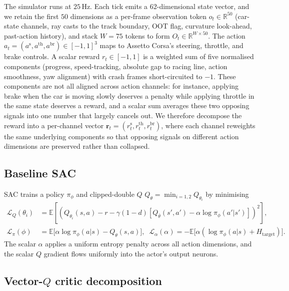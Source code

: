\documentclass{article}
\begin{document}
The simulator runs at $25$\,Hz. Each tick emits a $62$-dimensional
state vector, and we retain the first $50$ dimensions as a per-frame
observation token $o_t \in \mathbb{R}^{50}$ (car-state channels, ray
casts to the track boundary, OOT flag, curvature look-ahead,
past-action history), and stack $W{=}75$ tokens to form
$O_t \in \mathbb{R}^{W\times 50}$. The action
$a_t = (a^\mathrm{s}, a^\mathrm{th}, a^\mathrm{br}) \in [-1, 1]^3$ maps
to Assetto Corsa's steering, throttle, and brake controls. A scalar
reward $r_t \in [-1, 1]$ is a weighted sum of five normalised
components (progress, speed-tracking, absolute gap to racing line,
action smoothness, yaw alignment) with crash frames short-circuited
to $-1$. These components are not all aligned across action
channels: for instance, applying brake when the car is moving
slowly deserves a penalty while applying throttle in the same
state deserves a reward, and a scalar sum averages these two
opposing signals into one number that largely cancels out. We
therefore decompose the reward into a per-channel vector
$\mathbf{r}_t = (r^\mathrm{s}_t, r^\mathrm{th}_t, r^\mathrm{br}_t)$,
where each channel reweights the same underlying components so
that opposing signals on different action dimensions are preserved
rather than collapsed.

\subsection{Baseline SAC}

SAC trains a policy $\pi_\phi$ and clipped-double $Q$
$Q_\theta = \min_{i=1,2} Q_{\theta_i}$ by minimising
\begin{align}
\mathcal{L}_Q(\theta_i) &= \mathbb{E}
\!\left[\left(Q_{\theta_i}(s,a) - r - \gamma(1{-}d)\!\left[Q_{\bar\theta}(s', a') -
  \alpha \log \pi_\phi(a'|s')\right]\right)^2\right],
\label{eq:sac-q}\\
\mathcal{L}_\pi(\phi) &= \mathbb{E}\bigl[\alpha \log \pi_\phi(a|s) - Q_\theta(s, a)\bigr],
\;\;
\mathcal{L}_\alpha(\alpha) = -\mathbb{E}\bigl[\alpha(\log\pi_\phi(a|s) + H_\text{target})\bigr].
\label{eq:sac-pi}
\end{align}
The scalar $\alpha$ applies a uniform entropy penalty across all
action dimensions, and the scalar $Q$ gradient flows uniformly into
the actor's output neurons.

\subsection{Vector-$Q$ critic decomposition}
\label{sec:vector-q}
\end{document}
